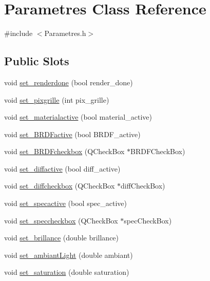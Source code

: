 \hypertarget{class_parametres}{
\section{Parametres Class Reference}
\label{class_parametres}
}


{\ttfamily \#include $<$Parametres.h$>$}

\subsection*{Public Slots}
\begin{DoxyCompactItemize}
\item 
void \hyperlink{class_parametres_a008e9463ee7fa5acdbee45d781c7cdea}{set\_\-renderdone} (bool render\_\-done)
\item 
void \hyperlink{class_parametres_a658b32829e5c44fef51dd3810da54269}{set\_\-pixgrille} (int pix\_\-grille)
\item 
void \hyperlink{class_parametres_a67257ac62859abe9b12e73e2855584ed}{set\_\-materialactive} (bool material\_\-active)
\item 
void \hyperlink{class_parametres_ad72016ae73392130bc0847aeb052049e}{set\_\-BRDFactive} (bool BRDF\_\-active)
\item 
void \hyperlink{class_parametres_a4787a8e8f4c9fac76f064838cfede189}{set\_\-BRDFcheckbox} (QCheckBox $\ast$BRDFCheckBox)
\item 
void \hyperlink{class_parametres_a61fc37779e0be7f9d5945d3738b83bf0}{set\_\-diffactive} (bool diff\_\-active)
\item 
void \hyperlink{class_parametres_aa4cd01d40258b81c871b5e1d9fc958b3}{set\_\-diffcheckbox} (QCheckBox $\ast$diffCheckBox)
\item 
void \hyperlink{class_parametres_ab83000ae05b6f433af197b627365b0c4}{set\_\-specactive} (bool spec\_\-active)
\item 
void \hyperlink{class_parametres_a4fdf6b1e4788d891d907dfa555ab6aa2}{set\_\-speccheckbox} (QCheckBox $\ast$specCheckBox)
\item 
void \hyperlink{class_parametres_a17447abf099f7ef44783d8a1b79c7729}{set\_\-brillance} (double brillance)
\item 
void \hyperlink{class_parametres_a5fd6b4913140b491889ca6948b9f5b7c}{set\_\-ambiantLight} (double ambiant)
\item 
void \hyperlink{class_parametres_a3b21807288cc65248affd45b271cdf5e}{set\_\-saturation} (double saturation)
\item 

\end{DoxyCompactItemize}
